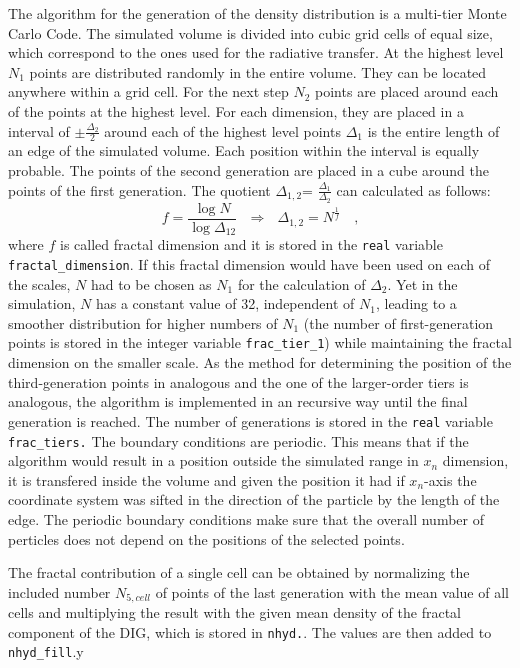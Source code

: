 \documentclass[a4paper,10pt]{article}
\begin{document}
\begin{appendix}
The algorithm for the generation of the density distribution is a multi-tier 
Monte Carlo Code. The simulated volume is divided into cubic grid  cells of 
equal size, which correspond to the ones used for the radiative transfer.
At the highest level \(N_1\) points are distributed randomly in the 
entire volume. They can be located anywhere within a grid cell. For the next 
step \(N_2\) points are placed around each of the points at the highest level. 
For each dimension, they are placed in a interval of \(\pm \frac{\Delta_2}{2}\) 
around each of the highest level points \(\Delta_1\) is the entire length of an 
edge of the simulated volume. Each position within the interval is equally 
probable. The points of the second generation are placed  in a cube around the 
points of the first generation. 
The quotient \(\Delta_{1,2}\)= \(\frac{\Delta_1}{\Delta_2}\) can calculated as 
follows:
\begin{equation}
 f= \frac{\log N}{\log \Delta_{1 2}}~~~\Longrightarrow ~~~ \Delta_{1,2} = 
N^{\frac{1}{f}}\mbox{~~~,}
\end{equation}
where \(f\) is called fractal dimension and it is stored in the \texttt{real} 
variable \texttt{fractal\_dimension}.  If this fractal dimension would have 
been used on each of the scales, \(N\) had to be chosen as \(N_1\) for the 
calculation of \(\Delta_2\). Yet in the simulation, \(N\) has a constant value 
of 32, independent of \(N_1\), leading to a smoother distribution for higher 
numbers of \(N_1\) (the number of first-generation points is stored in the 
integer variable \texttt{frac\_tier\_1}) while maintaining the fractal 
dimension on the smaller scale. As the method for determining the position of 
the third-generation points in analogous and the one of the larger-order tiers 
is analogous, the algorithm is implemented in an recursive way until the final 
generation is reached.  
The number of generations is stored in the \texttt{real} variable 
\texttt{frac\_tiers.}
The boundary conditions are periodic. This means that if the algorithm would 
result in a position outside the simulated range in \(x_n\) dimension, it is 
transfered inside the volume and given the position it  had if \(x_n\)-axis the 
coordinate system was sifted in the direction of the particle by the length of 
the edge. The periodic boundary conditions make sure that the overall number of 
perticles does not depend on the positions of the selected points.  

The fractal contribution of a single cell can be obtained by normalizing the 
included number \(N_{5,cell}\)  of points of the last 
generation with the mean value of all cells and multiplying the result with the 
given mean density of the fractal component of the DIG, which is stored in 
\texttt{nhyd.}. The values are then added to \texttt{nhyd\_fill}.y
    


\end{appendix}
\end{document}
